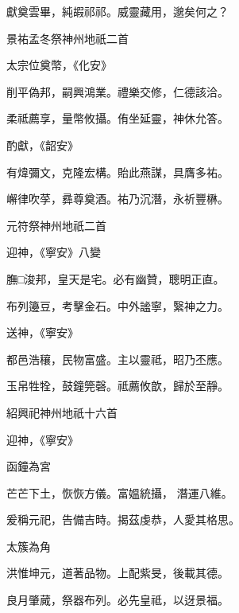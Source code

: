 \begin{pinyinscope}
 獻奠雲畢，純嘏祁祁。威靈藏用，邈矣何之？



 景祐孟冬祭神州地祇二首



 太宗位奠幣，《化安》



 削平偽邦，嗣興鴻業。禮樂交修，仁德該洽。



 柔祗薦享，量幣攸攝。侑坐延靈，神休允答。



 酌獻，《韶安》



 有煒彌文，克隆宏構。貽此燕謀，具膺多祐。



 嶰律吹莩，彞尊奠酒。祐乃沉潛，永祈豐楙。



 元符祭神州地祇二首



 迎神，《寧安》八變



 膴□浚邦，皇天是宅。必有幽贊，聰明正直。



 布列籩豆，考擊金石。中外謐寧，繄神之力。



 送神，《寧安》



 都邑浩穰，民物富盛。主以靈祗，昭乃丕應。



 玉帛牲牷，鼓鐘筦磬。祗薦攸歆，歸於至靜。



 紹興祀神州地祇十六首



 迎神，《寧安》



 函鐘為宮



 芒芒下土，恢恢方儀。富媼統攝，
 潛運八維。



 爰稱元祀，告備吉時。揭茲虔恭，人愛其格思。



 太簇為角



 洪惟坤元，道著品物。上配紫旻，後載其德。



 良月肇蕆，祭器布列。必先皇祗，以迓景福。




\end{pinyinscope}
